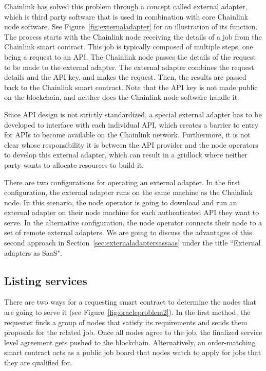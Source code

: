 \documentclass[12pt]{article}
\begin{document}
Chainlink has solved this problem through a concept called external adapter, which is third party software that is used in combination with core Chainlink node software.
See Figure~\ref{fig:externaladapter} for an illustration of its function.
The process starts with the Chainlink node receiving the details of a job from the Chainlink smart contract.
This job is typically composed of multiple steps, one being a request to an API.
The Chainlink node passes the details of the request to be made to the external adapter.
The external adapter combines the request details and the API key, and makes the request.
Then, the results are passed back to the Chainlink smart contract.
Note that the API key is not made public on the blockchain, and neither does the Chainlink node software handle it.
    
Since API design is not strictly standardized, a special external adapter has to be developed to interface with each individual API, which creates a barrier to entry for APIs to become available on the Chainlink network.
Furthermore, it is not clear whose responsibility it is between the API provider and the node operators to develop this external adapter, which can result in a gridlock where neither party wants to allocate resources to build it.

There are two configurations for operating an external adapter.
In the first configuration, the external adapter runs on the same machine as the Chainlink node.
In this scenario, the node operator is going to download and run an external adapter on their node machine for each authenticated API they want to serve.
In the alternative configuration, the node operator connects their node to a set of remote external adapters.
We are going to discuss the advantages of this second approach in Section~\ref{sec:externaladaptersassaas} under the title ``External adapters as SaaS".

\subsection{Listing services}
\label{sec:listingservices}

There are two ways for a requesting smart contract to determine the nodes that are going to serve it (see Figure~\ref{fig:oracleproblem2}).
In the first method, the requester finds a group of nodes that satisfy its requirements and sends them proposals for the related job.
Once all nodes agree to the job, the finalized service level agreement gets pushed to the blockchain.
Alternatively, an order-matching smart contract acts as a public job board that nodes watch to apply for jobs that they are qualified for.
\end{document}
